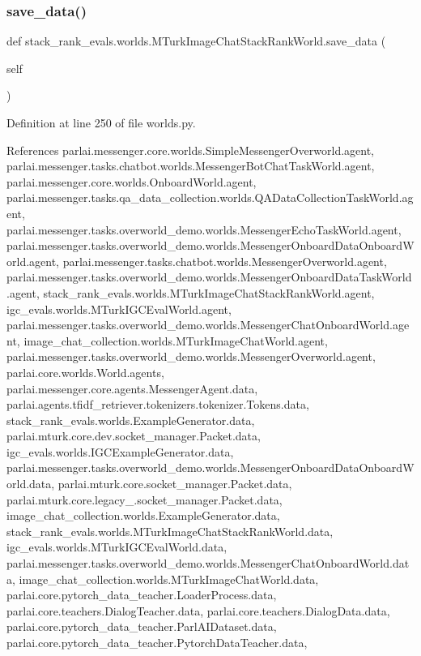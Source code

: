 \subsubsection{\texorpdfstring{save\+\_\+data()}{save\_data()}}
{\footnotesize\ttfamily def stack\+\_\+rank\+\_\+evals.\+worlds.\+M\+Turk\+Image\+Chat\+Stack\+Rank\+World.\+save\+\_\+data (\begin{DoxyParamCaption}\item[{}]{self }\end{DoxyParamCaption})}



Definition at line 250 of file worlds.\+py.



References parlai.\+messenger.\+core.\+worlds.\+Simple\+Messenger\+Overworld.\+agent, parlai.\+messenger.\+tasks.\+chatbot.\+worlds.\+Messenger\+Bot\+Chat\+Task\+World.\+agent, parlai.\+messenger.\+core.\+worlds.\+Onboard\+World.\+agent, parlai.\+messenger.\+tasks.\+qa\+\_\+data\+\_\+collection.\+worlds.\+Q\+A\+Data\+Collection\+Task\+World.\+agent, parlai.\+messenger.\+tasks.\+overworld\+\_\+demo.\+worlds.\+Messenger\+Echo\+Task\+World.\+agent, parlai.\+messenger.\+tasks.\+overworld\+\_\+demo.\+worlds.\+Messenger\+Onboard\+Data\+Onboard\+World.\+agent, parlai.\+messenger.\+tasks.\+chatbot.\+worlds.\+Messenger\+Overworld.\+agent, parlai.\+messenger.\+tasks.\+overworld\+\_\+demo.\+worlds.\+Messenger\+Onboard\+Data\+Task\+World.\+agent, stack\+\_\+rank\+\_\+evals.\+worlds.\+M\+Turk\+Image\+Chat\+Stack\+Rank\+World.\+agent, igc\+\_\+evals.\+worlds.\+M\+Turk\+I\+G\+C\+Eval\+World.\+agent, parlai.\+messenger.\+tasks.\+overworld\+\_\+demo.\+worlds.\+Messenger\+Chat\+Onboard\+World.\+agent, image\+\_\+chat\+\_\+collection.\+worlds.\+M\+Turk\+Image\+Chat\+World.\+agent, parlai.\+messenger.\+tasks.\+overworld\+\_\+demo.\+worlds.\+Messenger\+Overworld.\+agent, parlai.\+core.\+worlds.\+World.\+agents, parlai.\+messenger.\+core.\+agents.\+Messenger\+Agent.\+data, parlai.\+agents.\+tfidf\+\_\+retriever.\+tokenizers.\+tokenizer.\+Tokens.\+data, stack\+\_\+rank\+\_\+evals.\+worlds.\+Example\+Generator.\+data, parlai.\+mturk.\+core.\+dev.\+socket\+\_\+manager.\+Packet.\+data, igc\+\_\+evals.\+worlds.\+I\+G\+C\+Example\+Generator.\+data, parlai.\+messenger.\+tasks.\+overworld\+\_\+demo.\+worlds.\+Messenger\+Onboard\+Data\+Onboard\+World.\+data, parlai.\+mturk.\+core.\+socket\+\_\+manager.\+Packet.\+data, parlai.\+mturk.\+core.\+legacy\+\_.\+socket\+\_\+manager.\+Packet.\+data, image\+\_\+chat\+\_\+collection.\+worlds.\+Example\+Generator.\+data, stack\+\_\+rank\+\_\+evals.\+worlds.\+M\+Turk\+Image\+Chat\+Stack\+Rank\+World.\+data, igc\+\_\+evals.\+worlds.\+M\+Turk\+I\+G\+C\+Eval\+World.\+data, parlai.\+messenger.\+tasks.\+overworld\+\_\+demo.\+worlds.\+Messenger\+Chat\+Onboard\+World.\+data, image\+\_\+chat\+\_\+collection.\+worlds.\+M\+Turk\+Image\+Chat\+World.\+data, parlai.\+core.\+pytorch\+\_\+data\+\_\+teacher.\+Loader\+Process.\+data, parlai.\+core.\+teachers.\+Dialog\+Teacher.\+data, parlai.\+core.\+teachers.\+Dialog\+Data.\+data, parlai.\+core.\+pytorch\+\_\+data\+\_\+teacher.\+Parl\+A\+I\+Dataset.\+data, parlai.\+core.\+pytorch\+\_\+data\+\_\+teacher.\+Pytorch\+Data\+Teacher.\+data, 